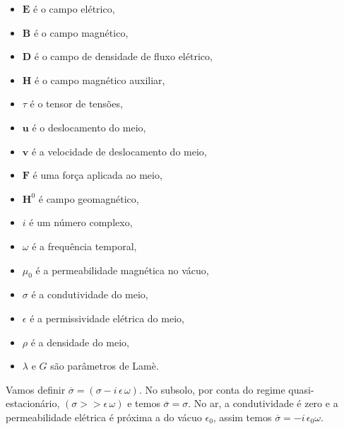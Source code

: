 \begin{itemize}
\item $\mathbf{{E}}$ \'e o campo el\'etrico,
\item $\mathbf{{B}}$ \'e o campo magn\'etico,
\item $\mathbf{{D}}$ \'e o campo de densidade de fluxo el\'etrico,
\item $\mathbf{{H}}$ \'e o campo magn\'etico auxiliar,
\item $\tau$ \'e o tensor de tens\~oes,
\item $\mathbf{{u}}$ \'e o deslocamento do meio,
\item $\mathbf{{v}}$ \'e a velocidade de deslocamento do meio,
\item $\mathbf{{F}}$ \'e uma for\c{c}a aplicada ao meio,
\item $\mathbf{H}^0$ \'e campo geomagn\'etico,
\item $i$ \'e um n\'umero complexo,
\item $\omega$ \'e a frequ\^encia temporal,
\item $\mu_0$ \'e a permeabilidade magn\'etica no v\'acuo,
\item $\sigma$ \'e a condutividade do meio,
\item $\epsilon$ \'e a permissividade el\'etrica do meio,
\item $\rho$ \'e a densidade do meio,
\item $\lambda$ e $G$ s\~ao par\^ametros de Lam\`e.
\end{itemize}
Vamos definir $\overline{\sigma}=(\sigma-i\,\epsilon\,\omega)$. No subsolo, por conta do regime quasi-estacion\'ario, $(\sigma>>\epsilon\,\omega)$  e  temos $\overline{\sigma}=\sigma$. No ar, a condutividade \'e zero e a permeabilidade el\'etrica \'e pr\'oxima a do v\'acuo $\epsilon_0$, assim temos $\overline{\sigma}=-i\,\epsilon_0\omega$.

